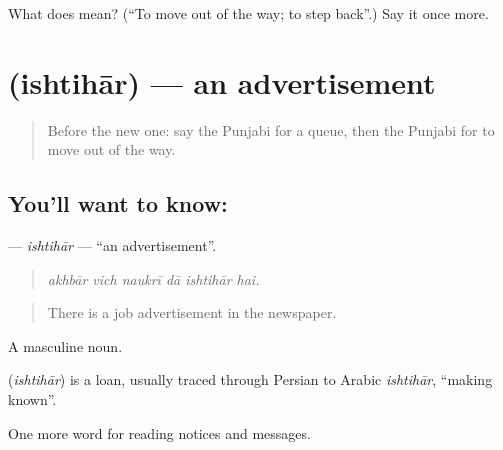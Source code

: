 \begin{tcolorbox}[breakable,colback=teal!4,colframe=teal!35!black,title={Before you move on}]
What does  mean? (\textquotedblleft{}To move out of the way; to step back\textquotedblright{}.) Say it once more.
\end{tcolorbox}
\section[\texorpdfstring{\pa{ਇਸ਼ਤਿਹਾਰ} (ishtihār)}{ਇਸ਼ਤਿਹਾਰ (ishtihār)}]{ (ishtihār) — an advertisement}

\label{lesson:PA-C253-ishtihar}



\begin{quote}
Before the new one: say the Punjabi for a queue, then the Punjabi for to move out of the way.
\end{quote}

\subsection*{You'll want to know: }
\textbf{} — \emph{ishtihār} — \textquotedblleft{}an advertisement\textquotedblright{}.

\begin{quote}
     
\end{quote}

\begin{quote}
\emph{akhbār vich naukrī dā ishtihār hai.}
\end{quote}

\begin{quote}
There is a job advertisement in the newspaper.
\end{quote}

A masculine noun.

\begin{cousinweb}
\textbf{} (\emph{ishtihār}) is a loan, usually traced through Persian to Arabic \emph{ishtihār}, \textquotedblleft{}making known\textquotedblright{}.
\end{cousinweb}

\begin{grammarlens}[title={What you've built}]
One more word for reading notices and messages.
\end{grammarlens}

